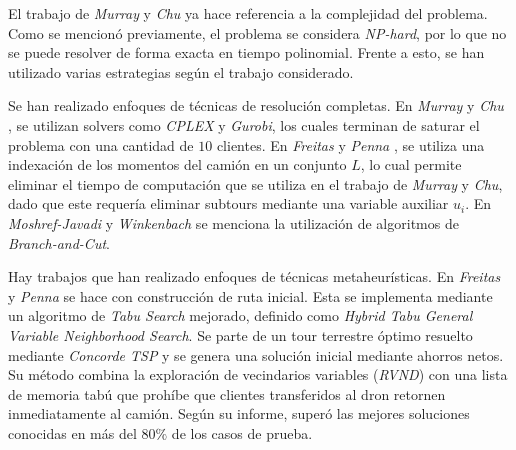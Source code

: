 El trabajo de \textit{Murray} y \textit{Chu} ya hace referencia a la complejidad del problema. Como se mencionó previamente, el problema se considera \textit{NP-hard}, por lo que no se puede resolver de forma exacta en tiempo polinomial. Frente a esto, se han utilizado varias estrategias según el trabajo considerado.

Se han realizado enfoques de técnicas de resolución completas. En \textit{Murray} y \textit{Chu} \cite{Murray2015Flying}, se utilizan solvers como \textit{CPLEX} y \textit{Gurobi}, los cuales terminan de saturar el problema con una cantidad de $10$ clientes. En \textit{Freitas} y \textit{Penna} \cite{freitas2021exact}, se utiliza una indexación de los momentos del camión en un conjunto $L$, lo cual permite eliminar el tiempo de computación que se utiliza en el trabajo de \textit{Murray} y \textit{Chu}, dado que este requería eliminar subtours mediante una variable auxiliar $u_i$. En \textit{Moshref-Javadi} y \textit{Winkenbach} \cite{moshrefjavadi2021applications} se menciona la utilización de algoritmos de \textit{Branch-and-Cut}.


Hay trabajos que han realizado enfoques de técnicas metaheurísticas. En \textit{Freitas} y \textit{Penna} \cite{freitas2021exact} se hace con construcción de ruta inicial. Esta se implementa mediante un algoritmo de \textit{Tabu Search} mejorado, definido como \textit{Hybrid Tabu General Variable Neighborhood Search}. Se parte de un tour terrestre óptimo resuelto mediante \textit{Concorde TSP} y se genera una solución inicial mediante ahorros netos. Su método combina la exploración de vecindarios variables (\textit{RVND}) con una lista de memoria tabú que prohíbe que clientes transferidos al dron retornen inmediatamente al camión. Según su informe, superó las mejores soluciones conocidas en más del $80\%$ de los casos de prueba.



